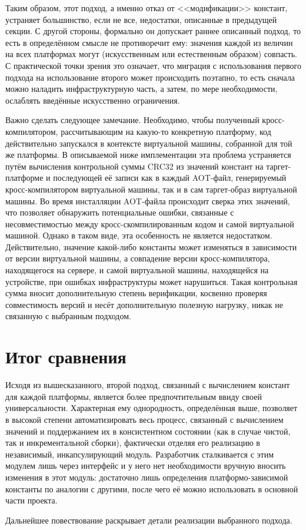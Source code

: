 \par
Таким образом, этот подход, а именно отказ от <<модификации>> констант, устраняет большинство, если не все, недостатки, описанные в предыдущей секции.
С другой стороны, формально он допускает раннее описанный подход, то есть в определённом смысле не противоречит ему: значения каждой из величин на всех платформах могут (искусственным или естественным образом) совпасть.
С практической точки зрения это означает, что миграция с использования первого подхода на использование второго может происходить поэтапно, то есть сначала можно наладить инфраструктурную часть, а затем, по мере необходимости, ослаблять введённые искусственно ограничения.

\par
Важно сделать следующее замечание.
Необходимо, чтобы полученный кросс-компилятором, рассчитывающим на какую-то конкретную платформу, код действительно запускался в контексте виртуальной машины, собранной для той же платформы.
В описываемой ниже имплементации эта проблема устраняется путём вычисления контрольной суммы CRC32 из значений констант на таргет-платформе и последующей её записи как в каждый AOT-файл, генерируемый кросс-компилятором виртуальной машины, так и в сам таргет-образ виртуальной машины.
Во время инсталляции AOT-файла происходит сверка этих значений, что позволяет обнаружить потенциальные ошибки, связанные с несовместимостью между кросс-скомпилированным кодом и самой виртуальной машиной.
Однако в таком виде, эта особенность не является недостатком.
Действительно, значение какой-либо константы может изменяться в зависимости от версии виртуальной машины, а совпадение версии кросс-компилятора, находящегося на сервере, и самой виртуальной машины, находящейся на устройстве, при ошибках инфраструктуры может нарушиться.
Такая контрольная сумма вносит дополнительную степень верификации, косвенно проверяя совместимость версий и несёт дополнительную полезную нагрузку, никак не связанную с выбранным подходом. 

\section{Итог сравнения}
Исходя из вышесказанного, второй подход, связанный с вычислением констант для каждой платформы, является более предпочтительным ввиду своей универсальности.
Характерная ему однородность, определённая выше, позволяет в высокой степени автоматизировать весь процесс, связанный с вычислением значений и поддержанием их в консистентном состоянии (как в случае чистой, так и инкрементальной сборки), фактически отделяя его реализацию в независимый, инкапсулирующий модуль.
Разработчик сталкивается с этим модулем лишь через интерфейс и у него нет необходимости вручную вносить изменения в этот модуль: достаточно лишь определения платформо-зависимой константы по аналогии с другими, после чего её можно использовать в основной части проекта.

\par
Дальнейшее повествование раскрывает детали реализации выбранного подхода.
 
\newpage